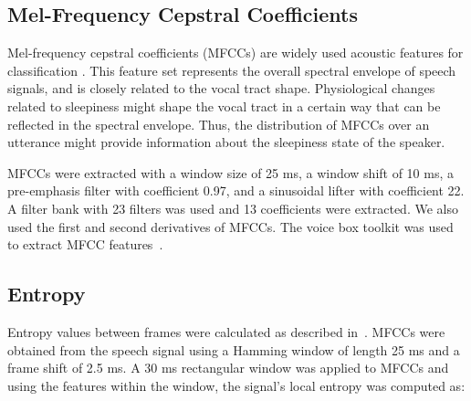 
 


\subsection{Mel-Frequency Cepstral Coefficients}

Mel-frequency cepstral coefficients (MFCCs) are widely used acoustic features for classification .  This feature set represents the overall spectral envelope of speech signals, and is closely related to the vocal tract shape. Physiological changes related to sleepiness might shape the vocal tract in a certain way that can be reflected in the spectral envelope. Thus, the distribution of MFCCs over an utterance might provide information about the sleepiness state of the speaker.

MFCCs were extracted with a window size of 25 ms, a window shift of 10 ms, a pre-emphasis filter with coefficient 0.97, and a sinusoidal lifter with coefficient 22. A filter bank with 23 filters was used and 13 coefficients were extracted. We also used the first and second derivatives of MFCCs. The voice box toolkit was used to extract MFCC features~\cite{brookes1997voicebox}.

\subsection{Entropy}

Entropy values between frames were calculated as described in~\cite{you2004entropy}. MFCCs were obtained from the speech signal using a Hamming window of length 25 ms and a frame shift of 2.5 ms. A 30 ms rectangular window was applied to MFCCs and using the features within the window, the signal's local entropy was computed as:

